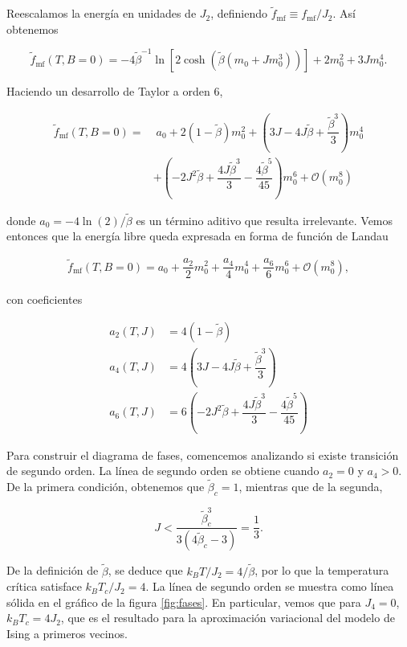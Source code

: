 \documentclass[10pt]{article}
\begin{document}
Reescalamos la energ\'ia en unidades de $J_2$, definiendo $\tilde{f}_{\mathrm{mf}} \equiv f_{\mathrm{mf}}/J_2$. As\'i obtenemos

\begin{equation}
\tilde{f}_{\mathrm{mf}}(T,B=0) = -4\tilde{\beta}^{-1} \ln \left[2 \cosh\left(\tilde{\beta} ( m_0 + J m_0^3)\right) \right] +2 m_0^2 + 3 J m_0^4.
\end{equation}

Haciendo un desarrollo de Taylor a orden 6,

\begin{align}
\tilde{f}_{\mathrm{mf}}(T,B=0) =& \;a_0 + 2(1-\tilde{\beta}) m_0^2 + 
\left(3J - 4J\tilde{\beta} + \dfrac{\tilde{\beta}^3}{3} \right) m_0^4 \nonumber \\
&+ \left(-2 J^2\tilde{\beta} + \dfrac{4J\tilde{\beta}^3}{3} - \dfrac{4\tilde{\beta}^5}{45}\right) m_0^6 + \mathcal{O}(m_0^8)
\end{align}

donde $a_0 = -4\ln(2)/\tilde{\beta}$ es un t\'ermino aditivo que resulta irrelevante. Vemos entonces que la energ\'ia libre queda expresada en forma de funci\'on de Landau

\begin{align}
\tilde{f}_{\mathrm{mf}}(T,B=0) = a_0 + \dfrac{a_2}{2} m_0^2 + 
\dfrac{a_4}{4} m_0^4 + \dfrac{a_6}{6} m_0^6 + \mathcal{O}(m_0^8),
\end{align}

con coeficientes 

\begin{align*}
a_2(T,J) &= 4 (1-\tilde{\beta})\\
a_4(T,J) &= 4\left( 3J - 4J\tilde{\beta} + \dfrac{\tilde{\beta}^3}{3} \right) \\
a_6(T,J) &= 6 \left(-2 J^2\tilde{\beta} + \dfrac{4J\tilde{\beta}^3}{3} - \dfrac{4\tilde{\beta}^5}{45}\right)
\end{align*}

Para construir el diagrama de fases, comencemos analizando si existe transici\'on de segundo orden. La l\'inea de segundo orden se obtiene cuando $a_2=0$ y $a_4>0$. De la primera condici\'on, obtenemos que $\tilde{\beta}_c = 1$, mientras que de la segunda,


\begin{equation}
J < \dfrac{\tilde{\beta}_c^3}{3(4\tilde{\beta}_c-3)}=\dfrac{1}{3}.
\end{equation}

De la definici\'on de $\tilde{\beta}$, se deduce que $k_B T/J_2 = 4 /\tilde{\beta}$, por lo que la temperatura cr\'itica satisface $k_B T_c/J_2 = 4$. La l\'inea de segundo orden se muestra como l\'inea s\'olida en el gr\'afico de la figura \ref{fig:fases}. En particular, vemos que para $J_4=0$, $k_B T_c = 4 J_2$, que es el resultado para la aproximaci\'on variacional del modelo de Ising a primeros vecinos.
\end{document}
